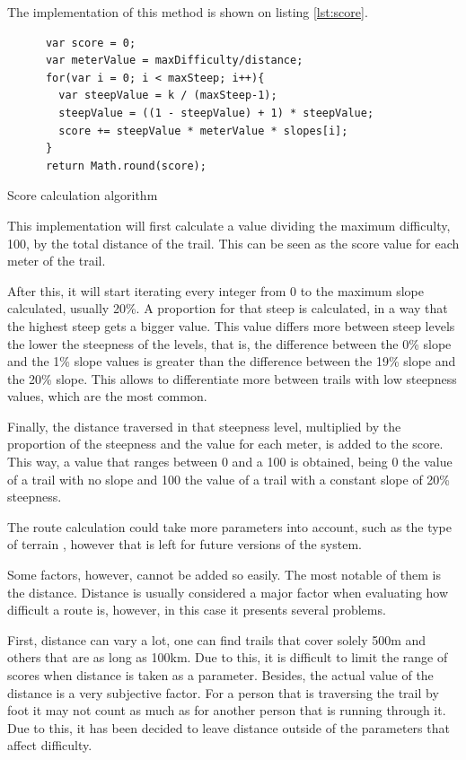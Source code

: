 The implementation of this method is shown on listing \ref{lst:score}.

\begin{listing}[ht]\centering
  \begin{minipage}{.7\textwidth}
    \begin{verbatim}
      var score = 0;
      var meterValue = maxDifficulty/distance;
      for(var i = 0; i < maxSteep; i++){
        var steepValue = k / (maxSteep-1);
        steepValue = ((1 - steepValue) + 1) * steepValue;
        score += steepValue * meterValue * slopes[i];
      }
      return Math.round(score);
    \end{verbatim}
  \end{minipage}
  \caption{Score calculation algorithm}\label{lst:score}
\end{listing}

This implementation will first calculate a value dividing the maximum difficulty, 100, by the total distance of the trail. This can be seen as the score value for each meter of the trail.

After this, it will start iterating every integer from 0 to the maximum slope calculated, usually 20\%. A proportion for that steep is calculated, in a way that the highest steep gets a bigger value. This value differs more between steep levels the lower the steepness of the levels, that is, the difference between the 0\% slope and the 1\% slope values is greater than the difference between the 19\% slope and the 20\% slope. This allows to differentiate more between trails with low steepness values, which are the most common.

Finally, the distance traversed in that steepness level, multiplied by the proportion of the steepness and the value for each meter, is added to the score. This way, a value that ranges between 0 and a 100 is obtained, being 0 the value of a trail with no slope and 100 the value of a trail with a constant slope of 20\% steepness.

The route calculation could take more parameters into account, such as the type of terrain , however that is left for future versions of the system.

Some factors, however, cannot be added so easily. The most notable of them is the distance. Distance is usually considered a major factor when evaluating how difficult a route is, however, in this case it presents several problems. 

First, distance can vary a lot, one can find trails that cover solely 500m and others that are as long as 100km. Due to this, it is difficult to limit the range of scores when distance is taken as a parameter. Besides, the actual value of the distance is a very subjective factor. For a person that is traversing the trail by foot it may not count as much as for another person that is running through it. Due to this, it has been decided to leave distance outside of the parameters that affect difficulty.

